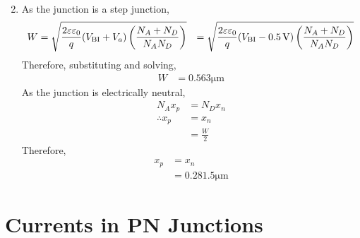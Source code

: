 \documentclass[titlepage, fleqn, a4paper, 12pt, twoside]{article}
\theoremstyle{definition}
\theoremstyle{theorem}
\begin{document}
\begin{solution}
\begin{enumerate}[leftmargin=*]
\begin{align*}
			\end{align*}
		\item
			As the junction is a step junction,
			\begin{align*}
				W & = \sqrt{\frac{2 \varepsilon \varepsilon_0}{q} (V_{\text{BI}} + V_a) \left( \frac{N_A + N_D}{N_A N_D} \right)}
                                  & = \sqrt{\frac{2 \varepsilon \varepsilon_0}{q} (V_{\text{BI}} - 0.5 \volt) \left( \frac{N_A + N_D}{N_A N_D} \right)}
			\end{align*}
			Therefore, substituting and solving,
			\begin{align*}
				W & = 0.563 \si{\micro\metre}
			\end{align*}
			As the junction is electrically neutral,
			\begin{align*}
				N_A x_p        & = N_D x_n \\
				\therefore x_p & = x_n     \\
                                               & = \frac{W}{2}
			\end{align*}
			Therefore,
			\begin{align*}
				x_p & = x_n \\
                                    & = 0.281.5 \si{\micro\metre}
			\end{align*}
	\end{enumerate}
\end{solution}

\section{Currents in PN Junctions}
\end{document}
